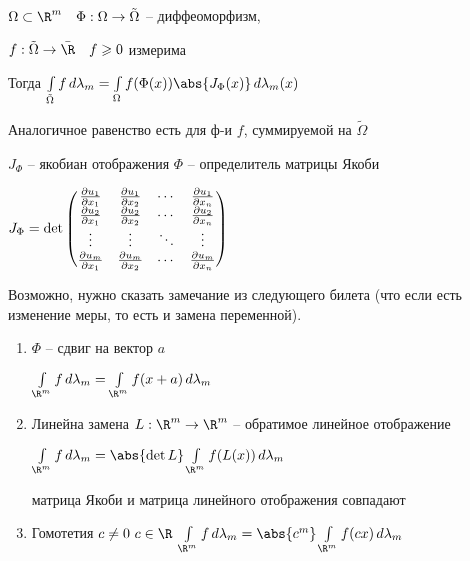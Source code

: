 
\begin{theorem}\thmslashn 
	
	$\Omega \subset \R^m \quad \Phi:\Omega \to \tilde{\Omega}$ -- диффеоморфизм, 
	
	$f:\tilde{\Omega}\to \bar{\R}\quad f \geqslant 0$ измерима
	
	Тогда $\int\limits_{\tilde{\Omega}} f\,d\lambda_m = \int\limits_{\Omega} f(\Phi(x)) \abs{J_\Phi(x)}\,d\lambda_m(x)$
	
	Аналогичное равенство есть для ф-и $f$, суммируемой на $\tilde{\Omega}$

	$J_\Phi$ -- якобиан отображения $\Phi$ -- определитель матрицы Якоби
	
	$J_\Phi = \det\begin{pmatrix}
	{\partial u_1 \over \partial x_1} & {\partial u_1 \over \partial x_2} & \cdots & {\partial u_1 \over \partial x_n} \\
	{\partial u_2 \over \partial x_1} & {\partial u_2 \over \partial x_2} & \cdots & {\partial u_2 \over \partial x_n} \\
	\vdots & \vdots & \ddots &\vdots \\
	{\partial u_m \over \partial x_1} & {\partial u_m \over \partial x_2} & \cdots & {\partial u_m \over \partial x_n}
	\end{pmatrix}$
\end{theorem}

Возможно, нужно сказать замечание из следующего билета (что если есть изменение меры, то есть и замена переменной).

\begin{remark} \thmslashn

\begin{enumerate}
	\item $\Phi$ -- сдвиг на вектор $a$
	
	$\int\limits_{\R^m} f \,d\lambda_m = \int\limits_{\R^m}f(x+a)\,d\lambda_m$
	
	\item Линейна замена $L:\R^m \to \R^m$ -- обратимое линейное отображение
	
	$\int\limits_{\R^m} f \,d\lambda_m = \abs{\det L}\int\limits_{\R^m}f(L(x))\,d\lambda_m$
	
	матрица Якоби и матрица линейного отображения совпадают
	
	
	\item Гомотетия $c \not= 0\,\, c\in \R$
	$\int\limits_{\R^m} f \,d\lambda_m = \abs{c^m}\int\limits_{\R^m}f(cx)\,d\lambda_m$
	
\end{enumerate}

\end{remark}

